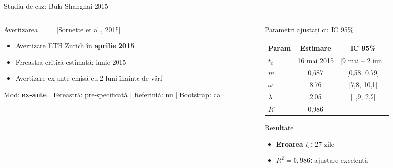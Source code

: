 \documentclass[9pt, aspectratio=169, t]{beamer}
\begin{document}
\begin{frame}{Studiu de caz: Bula Shanghai 2015}
\begin{cminipage}{0.95\textwidth}
{\begin{columns}[T]
\begin{column}{0.47\textwidth}
            \begin{exampleblock}{Avertizarea \href{https://www.er.ethz.ch/financial-crisis-observatory.html}{\textcolor{white}{FCO}} {\scriptsize[Sornette et al., 2015]}}
                \begin{itemize}\setlength{\itemsep}{0pt}
                    \item Avertizare \href{https://www.er.ethz.ch/financial-crisis-observatory.html}{ETH Zurich} în \textbf{aprilie 2015}
                    \item Fereastra critică estimată: iunie 2015
                    \item Avertizare ex-ante emisă cu 2 luni înainte de vârf
                \end{itemize}
            \end{exampleblock}
            \vspace{-2mm}
            {\scriptsize\textcolor{MediumGray}{Mod: \textbf{ex-ante} | Fereastră: pre-specificată | Referință: nu | Bootstrap: da}}
        \end{column}
        \begin{column}{0.47\textwidth}
            \begin{alertblock}{Parametri ajustați cu IC 95\%}
                \begin{center}
                    \begin{tabular}{lcc}
                        \toprule
                        \textbf{Param} & \textbf{Estimare} & \textbf{IC 95\%} \\
                        \midrule
                        $t_c$ & 16 mai 2015 & [9 mai -- 2 iun.] \\
                        $m$ & 0,687 & [0,58, 0,79] \\
                        $\omega$ & 8,76 & [7,8, 10,1] \\
                        $\lambda$ & 2,05 & [1,9, 2,2] \\
                        $R^2$ & 0,986 & --- \\
                        \bottomrule
                    \end{tabular}
                \end{center}
            \end{alertblock}

            \begin{exampleblock}{Rezultate}
                \begin{itemize}\setlength{\itemsep}{0pt}
                    \item \textbf{Eroarea $t_c$:} 27 zile
                    \item \textbf{$R^2 = 0{,}986$:} ajustare excelentă
                \end{itemize}
            \end{exampleblock}
        \end{column}
    \end{columns}
    }
    \end{cminipage}
\end{frame}
\end{document}
